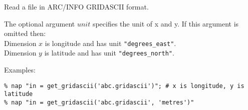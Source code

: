 Read a file in ARC/INFO GRIDASCII format.
  
 The optional argument 
  $unit$ specifies the unit of x and y. If this argument is
  omitted then:
  \\Dimension 
  $x$ is longitude and has unit 
  \texttt{"degrees\_east"}.
  \\Dimension 
  $y$ is latitude and has unit 
  \texttt{"degrees\_north"}.
  
 Examples:
  \begin{verbatim}
% nap "in = get_gridascii('abc.gridascii')"; # x is longitude, y is latitude
% nap "in = get_gridascii('abc.gridascii', 'metres')"
\end{verbatim}

